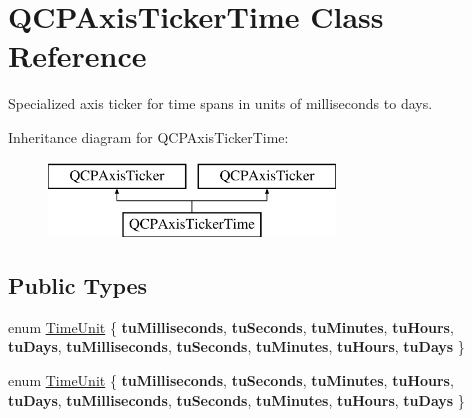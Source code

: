 \hypertarget{class_q_c_p_axis_ticker_time}{}\section{Q\+C\+P\+Axis\+Ticker\+Time Class Reference}
\label{class_q_c_p_axis_ticker_time}


Specialized axis ticker for time spans in units of milliseconds to days.  


Inheritance diagram for Q\+C\+P\+Axis\+Ticker\+Time\+:\begin{figure}[H]
\begin{center}
\leavevmode
\includegraphics[height=2.000000cm]{class_q_c_p_axis_ticker_time}
\end{center}
\end{figure}
\subsection*{Public Types}
\begin{DoxyCompactItemize}
\item 
enum \hyperlink{class_q_c_p_axis_ticker_time_a5c48ded8c6d3a1aca9b68219469fea3e}{Time\+Unit} \{ \newline
{\bfseries tu\+Milliseconds}, 
{\bfseries tu\+Seconds}, 
{\bfseries tu\+Minutes}, 
{\bfseries tu\+Hours}, 
\newline
{\bfseries tu\+Days}, 
{\bfseries tu\+Milliseconds}, 
{\bfseries tu\+Seconds}, 
{\bfseries tu\+Minutes}, 
\newline
{\bfseries tu\+Hours}, 
{\bfseries tu\+Days}
 \}
\item 
enum \hyperlink{class_q_c_p_axis_ticker_time_a5c48ded8c6d3a1aca9b68219469fea3e}{Time\+Unit} \{ \newline
{\bfseries tu\+Milliseconds}, 
{\bfseries tu\+Seconds}, 
{\bfseries tu\+Minutes}, 
{\bfseries tu\+Hours}, 
\newline
{\bfseries tu\+Days}, 
{\bfseries tu\+Milliseconds}, 
{\bfseries tu\+Seconds}, 
{\bfseries tu\+Minutes}, 
\newline
{\bfseries tu\+Hours}, 
{\bfseries tu\+Days}
 \}
\end{DoxyCompactItemize}
